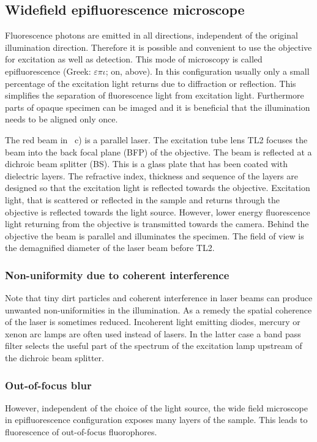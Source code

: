 \subsection{Widefield epifluorescence microscope}
Fluorescence photons are emitted in all directions, independent of the
original illumination direction. Therefore it is possible and
convenient to use the objective for excitation as well as
detection. This mode of microscopy is called epifluorescence (Greek:
$\varepsilon\pi\iota$; on, above).  In this configuration usually only
a small percentage of the excitation light returns due to diffraction
or reflection. This simplifies the separation of fluorescence light
from excitation light.  Furthermore parts of opaque specimen can be
imaged and it is beneficial that the illumination needs to be aligned
only once.


The red beam in ~c) is a parallel
laser. The excitation tube lens TL2 focuses the beam into the back
focal plane (BFP) of the objective. The beam is reflected at a
dichroic beam splitter (BS). This is a glass plate that has been
coated with dielectric layers. The refractive index, thickness and
sequence of the layers are designed so that the excitation light is
reflected towards the objective. Excitation light, that is scattered
or reflected in the sample and returns through the objective is
reflected towards the light source. However, lower energy fluorescence
light returning from the objective is transmitted towards the
camera. Behind the objective the beam is parallel and illuminates the
specimen. The field of view is the demagnified diameter of the laser
beam before TL2.
\subsubsection*{Non-uniformity due to coherent interference}
Note that tiny dirt particles and coherent interference in laser beams
can produce unwanted non-uniformities in the illumination. As a remedy
the spatial coherence of the laser is sometimes reduced.  Incoherent
light emitting diodes, mercury or xenon arc lamps are often used
instead of lasers. In the latter case a band pass filter selects the
useful part of the spectrum of the excitation lamp upstream of the
dichroic beam splitter.

\subsubsection{Out-of-focus blur}
However, independent of the choice of the light source, the wide field
microscope in epifluorescence configuration exposes many layers of the
sample. This leads to fluorescence of out-of-focus fluorophores.

